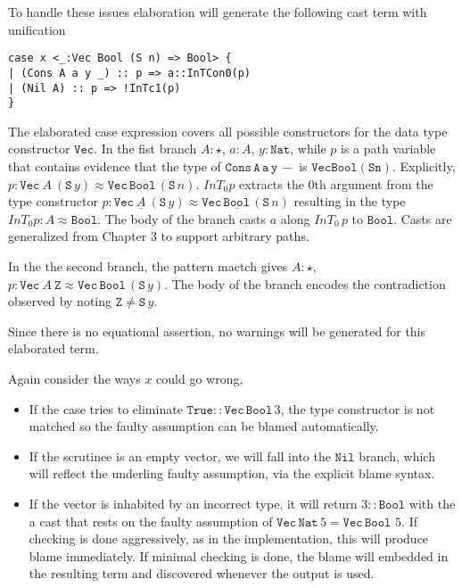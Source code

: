 To handle these issues elaboration will generate the following cast term with unification

\begin{lstlisting}[basicstyle={\ttfamily\small}]
case x <_:Vec Bool (S n) => Bool> {
| (Cons A a y _) :: p => a::InTCon0(p)
| (Nil A) :: p => !InTc1(p)
}
\end{lstlisting}

The elaborated case expression covers all possible constructors for the data type constructor $\mathtt{Vec}$. 
In the fist branch $A:\star$, $a:A$, $y:\mathtt{Nat}$, while $p$ is a path variable that contains evidence that the type of $\mathtt{Cons\,A\,a\,y\,-}$ is $\mathtt{Vec Bool (S n)}$.
Explicitly, $p:\mathtt{Vec}\ A\ (\mathtt{S}\,y)\approx\mathtt{Vec}\,\mathtt{Bool}\,(\mathtt{S}\,n)$.
$InT_{0}p$ extracts the 0th argument from the type constructor $p:\mathtt{Vec}\ \underline{A}\ (\mathtt{S}\,y)\approx\mathtt{Vec}\,\underline{\mathtt{Bool}}\,(\mathtt{S}\,n)$ resulting in the type $InT_{0}p:A\approx\mathtt{Bool}$.
The body of the branch casts $a$ along $InT_{0}\,p$ to $\mathtt{Bool}$.
Casts are generalized from Chapter 3 to support arbitrary paths.

In the the second branch, the pattern mactch gives $A:\star$, $p:\mathtt{Vec}\ A\ \mathtt{Z}\approx\mathtt{Vec}\,\mathtt{Bool}\,(\mathtt{S}\,y)$.
The body of the branch encodes the contradiction observed by noting $\mathtt{Z}\neq\mathtt{S}\,y$.

Since there is no equational assertion, no warnings will be generated for this elaborated term.

Again consider the ways $x$ could go wrong,
\begin{itemize}
\item 
If the case tries to eliminate $\mathtt{True}::\mathtt{Vec}\,\mathtt{Bool}\,3$, the type constructor is not matched so the faulty assumption can be blamed automatically.
\item 
If the scrutinee is an empty vector, we will fall into the $\mathtt{Nil}$ branch, which will reflect the underling faulty assumption, via the explicit blame syntax.
\item
If the vector is inhabited by an incorrect type, it will return $3::\mathtt{Bool}$ with the a cast that rests on the faulty assumption of $\mathtt{Vec}\,\mathtt{Nat}\,5=\mathtt{Vec}\,\mathtt{Bool}\,\,5$.
If checking is done aggressively, as in the implementation, this will produce blame immediately.
If minimal checking is done, the blame will embedded in the resulting term and discovered whenever the output is used.
\end{itemize}

